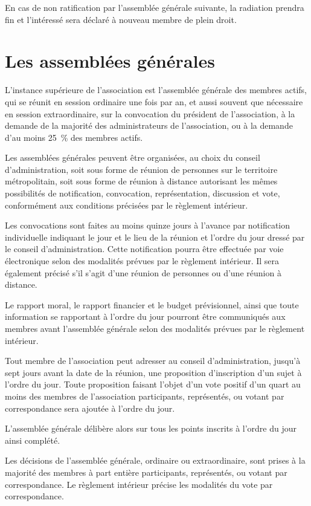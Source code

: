 \documentclass[a4wide,12pt]{scrartcl}
\begin{document}
En cas de non ratification par l'assemblée générale suivante, la
radiation prendra fin et l'intéressé sera déclaré à nouveau membre de
plein droit.

\section{Les assemblées générales}

L'instance supérieure de l'association est l'assemblée générale des
membres actifs, qui se réunit en session ordinaire une fois par an, et
aussi souvent que nécessaire en session extraordinaire, sur la
convocation du président de l'association, à la demande de la majorité
des administrateurs de l'association, ou à la demande d'au moins 25~\%
des membres actifs.

Les assemblées générales peuvent être organisées, au choix du conseil
d'administration, soit sous forme de réunion de personnes sur le
territoire métropolitain, soit sous forme de réunion à distance
autorisant les mêmes possibilités de notification, convocation,
représentation, discussion et vote, conformément aux conditions
précisées par le règlement intérieur.

Les convocations sont faites au moins quinze jours à l'avance par
notification individuelle indiquant le jour et le lieu de la réunion
et l'ordre du jour dressé par le conseil d'administration. Cette
notification pourra être effectuée par voie électronique selon des
modalités prévues par le règlement intérieur. Il sera également
précisé s'il s'agit d'une réunion de personnes ou d'une réunion à
distance.

Le rapport moral, le rapport financier et le budget prévisionnel,
ainsi que toute information se rapportant à l'ordre du jour pourront
être communiqués aux membres avant l'assemblée générale selon des
modalités prévues par le règlement intérieur.

Tout membre de l'association peut adresser au conseil
d'administration, jusqu'à sept jours avant la date de la réunion, une
proposition d'inscription d'un sujet à l'ordre du jour. Toute
proposition faisant l'objet d'un vote positif d'un quart au moins des
membres de l'association participants, représentés, ou votant par
correspondance sera ajoutée à l'ordre du jour.

L'assemblée générale délibère alors sur tous les points inscrits à
l'ordre du jour ainsi complété.

Les décisions de l'assemblée générale, ordinaire ou extraordinaire,
sont prises à la majorité des membres à part entière participants,
représentés, ou votant par correspondance. Le règlement intérieur
précise les modalités du vote par correspondance.
\end{document}
